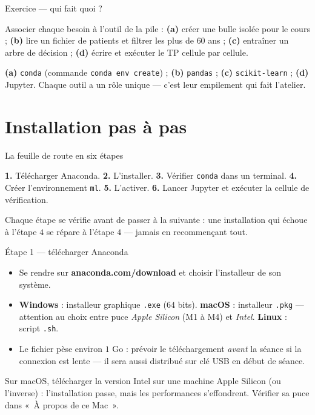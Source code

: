 \documentclass[aspectratio=169,11pt]{beamer}
\begin{document}
\begin{frame}{Exercice — qui fait quoi ?}
\begin{ucadrec}[Énoncé]
{\small Associer chaque besoin à l'outil de la pile : \textbf{(a)} créer une bulle isolée pour le cours ; \textbf{(b)} lire un fichier de patients et filtrer les plus de $60$ ans ; \textbf{(c)} entraîner un arbre de décision ; \textbf{(d)} écrire et exécuter le TP cellule par cellule.}
\end{ucadrec}
\pause
\begin{ucadex}[Correction]
{\small \textbf{(a)} \texttt{conda} (commande \texttt{conda env create}) ; \textbf{(b)} \texttt{pandas} ; \textbf{(c)} \texttt{scikit-learn} ; \textbf{(d)} Jupyter. Chaque outil a un rôle unique — c'est leur empilement qui fait l'atelier.}
\end{ucadex}
\end{frame}

\section{Installation pas à pas}

\begin{frame}{La feuille de route en six étapes}
\begin{ucadret}
{\small \textbf{1.} Télécharger Anaconda. \;\textbf{2.} L'installer. \;\textbf{3.} Vérifier \texttt{conda} dans un terminal. \;\textbf{4.} Créer l'environnement \texttt{ml}. \;\textbf{5.} L'activer. \;\textbf{6.} Lancer Jupyter et exécuter la cellule de vérification.}
\end{ucadret}
{\small Chaque étape se vérifie avant de passer à la suivante : une installation qui échoue à l'étape $4$ se répare à l'étape $4$ — jamais en recommençant tout.}
\end{frame}

\begin{frame}{Étape 1 — télécharger Anaconda}
\begin{itemize}\small
  \item Se rendre sur \textbf{anaconda.com/download} et choisir l'installeur de son système.
  \item \textbf{Windows} : installeur graphique \texttt{.exe} ($64$ bits). \quad \textbf{macOS} : installeur \texttt{.pkg} — attention au choix entre puce \emph{Apple Silicon} (M1 à M4) et \emph{Intel}. \quad \textbf{Linux} : script \texttt{.sh}.
  \item Le fichier pèse environ $1$ Go : prévoir le téléchargement \emph{avant} la séance si la connexion est lente — il sera aussi distribué sur clé USB en début de séance.
\end{itemize}
\begin{ucadpiege}
{\small Sur macOS, télécharger la version Intel sur une machine Apple Silicon (ou l'inverse) : l'installation passe, mais les performances s'effondrent. Vérifier sa puce dans «~À propos de ce Mac~».}
\end{ucadpiege}
\end{frame}
\end{document}
